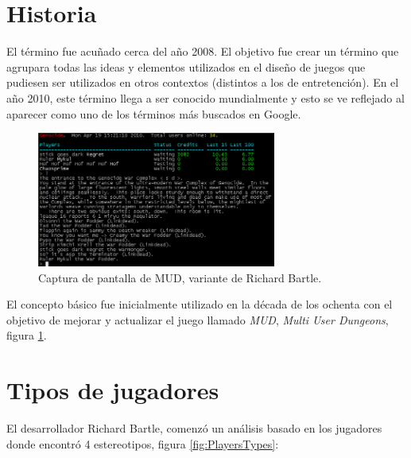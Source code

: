 \section{Historia}

El término {\GAM} fue acuñado cerca del año 2008\cite{DefineGamefication}.
El objetivo fue crear un término que agrupara todas las ideas y elementos
utilizados en el diseño de juegos que pudiesen ser utilizados en otros contextos
(distintos a los de entretención).
En el año 2010, este término llega a ser conocido mundialmente  y esto se ve reflejado
 al aparecer como uno de los términos más buscados en Google\cite{GamWorks}.

\begin{figure}[!htb]
  \centering
  \includegraphics[width=0.7\textwidth]{images/mud_SS_2.jpg}
  \caption[Captura de pantalla de juego MUD]{Captura de pantalla de MUD,
  variante de Richard Bartle.}
  \label{fig:MudClient}
\end{figure}

El concepto básico fue inicialmente utilizado en la década de los ochenta con el
objetivo de mejorar y actualizar el juego llamado \emph{MUD}, \emph{Multi User Dungeons}, 
figura \ref{fig:MudClient}.

\section{Tipos de jugadores}

El desarrollador Richard Bartle, comenzó un análisis basado en los jugadores
donde encontró 4 estereotipos, figura \ref{fig:PlayersTypes}:

